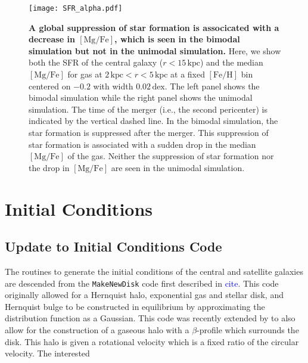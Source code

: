 \documentclass[linenumbers, twocolumn]{aastex631}
\newcommand{\kpc}{\ensuremath{\textrm{kpc}}}
\newcommand{\tocite}{\textcolor{blue}{cite}}
\newcommand{\FeH}{\ensuremath{[\textrm{Fe}/\textrm{H}]}}
\newcommand{\MgFe}{\ensuremath{[\textrm{Mg}/\textrm{Fe}]}}
\newcommand{\dex}{\ensuremath{\textrm{dex}}}
\begin{document}
\begin{figure*}
  \centering
  \texttt{[image: SFR\_alpha.pdf]}
  \caption{\textbf{A global suppression of star formation is associcated with a decrease in \MgFe{}, which is seen in the bimodal simulation but not in the unimodal simulation.} Here, we show both the SFR of the central galaxy ($r<15\,\kpc$) and the median \MgFe{} for gas at $2\,\kpc<r<5\,\kpc$ at a fixed \FeH{} bin centered on $-0.2$ with width $0.02\,\dex$. The left panel shows the bimodal simulation while the right panel shows the unimodal simulation. The time of the merger (i.e., the second pericenter) is indicated by the vertical dashed line. In the bimodal simulation, the star formation is suppressed after the merger. This suppression of star formation is associated with a sudden drop in the median \MgFe{} of the gas. Neither the suppression of star formation nor the drop in \MgFe{} are seen in the unimodal simulation.}
  \label{fig:SFR_alpha}
\end{figure*}


{}




\appendix

\section{Initial Conditions}\label{app:ics}
\subsection{Update to Initial Conditions Code}
The routines to generate the initial conditions of the central and satellite galaxies are descended from the \texttt{MakeNewDisk} code first described in \tocite. This code originally allowed for a Hernquist halo, exponential gas and stellar disk, and Hernquist bulge to be constructed in equilibrium by approximating the distribution function as a Gaussian. This code was recently extended by \citet{2023MNRAS.tmp.2070B} to also allow for the construction of a gaseous halo with a $\beta$-profile which surrounds the disk. This halo is given a rotational velocity which is a fixed ratio of the circular velocity. The interested 
\end{document}
